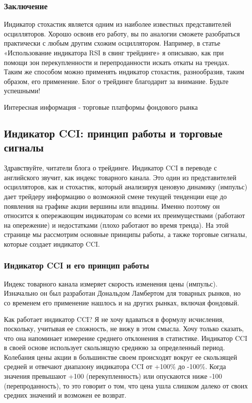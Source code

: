\documentclass[a5paper]{article}
\begin{document}
\subsubsection{Заключение}

Индикатор стохастик является одним из наиболее известных представителей осцилляторов. Хорошо освоив его работу, вы по аналогии сможете разобраться практически с любым другим схожим осциллятором. Например, в статье «Использование индикатора RSI в свинг трейдинге» я описываю, как при помощи зон перекупленности и перепроданности искать откаты на трендах. Таким же способом можно применять индикатор стохастик, разнообразив, таким образом, его применение. Блог о трейдинге благодарит за внимание. Будьте успешными!


Интересная информация - торговые платформы фондового рынка

\subsection{Индикатор CCI: принцип работы и торговые сигналы}

Здравствуйте, читатели блога о трейдинге. Индикатор CCI в переводе с английского звучит, как индекс товарного канала. Это один из представителей осцилляторов, как и стохастик, который анализируя ценовую динамику (импульс) дает трейдеру информацию о возможной смене текущей тенденции еще до появления на графике акции вершины или впадины. Именно поэтому он относится к опережающим индикаторам со всеми их преимуществами (работают на опережение) и недостатками (плохо работают во время тренда). На этой странице мы рассмотрим основные принципы работы, а также торговые сигналы, которые создает индикатор CCI.

\subsubsection{Индикатор CCI и его принцип работы}

Индекс товарного канала измеряет скорость изменения цены (импульс). Изначально он был разработан Дональдом Ламбертом для товарных рынков, но со временем его применение нашлось и на других рынках, включая фондовый.

Как работает индикатор CCI? Я не хочу вдаваться в формулу исчисления, поскольку, учитывая ее сложность, не вижу в этом смысла. Хочу только сказать, что она напоминает измерение среднего отклонения в статистике. Индикатор CCI в своей основе использует скользящую среднюю за определенный период. Колебания цены акции в большинстве своем происходят вокруг ее скользящей средней и отвечают диапазону индикатора CCI от +100\% до -100\%. Когда значения превышают +100 (перекупленность) или опускаются ниже -100 (перепроданность), то это говорит о том, что цена ушла слишком далеко от своих средних значений и возможен ее возврат.
\end{document}
